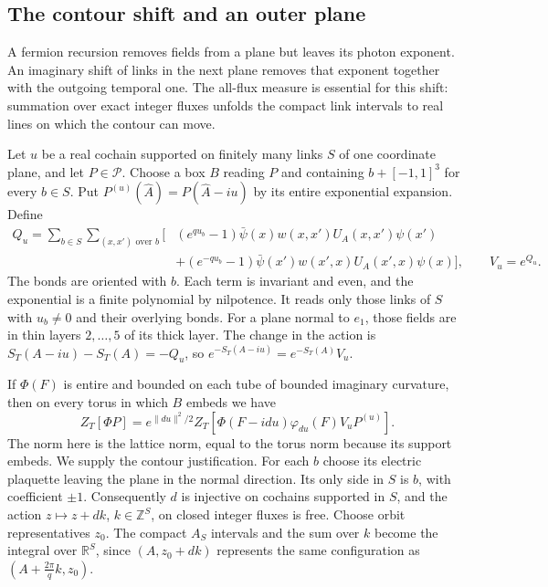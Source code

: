 \documentclass[11pt,letterpaper,reqno]{amsart}
\newcommand{\R}{\mathbb R}
\newcommand{\Z}{\mathbb Z}
\begin{document}
\subsection{The contour shift and an outer plane}\label{subsec:diag-contour}

A fermion recursion removes fields from a plane but leaves its
photon exponent. An imaginary shift of links in the next plane
removes that exponent together with the outgoing temporal one.
The all-flux measure is essential for this shift: summation over
exact integer fluxes unfolds the compact link intervals to
real lines on which the contour can move.

Let $u$ be a real cochain supported on finitely many links $S$
of one coordinate plane, and let $P\in\mathcal P$. Choose a
box $B$ reading $P$ and containing $b+[-1,1]^3$ for every
$b\in S$. Put $P^{(u)}(\widehat A)=P(\widehat A-iu)$ by
its entire exponential expansion. Define
\begin{equation}\label{eq:diag-shift-fermion-polynomial}
 \begin{split}
 Q_u=\sum_{b\in S}\sum_{(x,x')\text{ over }b}\big[&
 (e^{qu_b}-1)\bar\psi(x)w(x,x')U_A(x,x')\psi(x')\\
 &+(e^{-qu_b}-1)\bar\psi(x')w(x',x)U_A(x',x)\psi(x)\big],
 \qquad V_u=e^{Q_u}.
 \end{split}
\end{equation}
The bonds are oriented with $b$. Each term is invariant and
even, and the exponential is a finite polynomial by nilpotence.
It reads only those links of $S$ with $u_b\ne0$ and their
overlying bonds. For a plane normal to $e_1$, those fields
are in thin layers $2,\ldots,5$ of its thick layer. The change
in the action is $S_T(A-iu)-S_T(A)=-Q_u$, so
$e^{-S_T(A-iu)}=e^{-S_T(A)}V_u$.

If $\Phi(F)$ is entire and bounded on each tube of bounded
imaginary curvature, then on every torus in which $B$ embeds
we have
\begin{equation}\label{eq:diag-contour-identity}
 Z_T[\Phi P]=e^{\|du\|^2/2}
       Z_T[\Phi(F-idu)\varphi_{du}(F)V_uP^{(u)}].
\end{equation}
The norm here is the lattice norm, equal to the torus norm
because its support embeds. We supply the contour justification.
For each $b$ choose its electric plaquette leaving the plane
in the normal direction. Its only side in $S$ is $b$, with
coefficient $\pm1$. Consequently $d$ is injective on cochains
supported in $S$, and the action
$z\mapsto z+dk$, $k\in\Z^S$, on closed integer fluxes is free.
Choose orbit representatives $z_0$. The compact $A_S$ intervals
and the sum over $k$ become the integral over $\R^S$, since
$(A,z_0+dk)$ represents the same configuration as
$(A+\frac{2\pi}{q}k,z_0)$.
\end{document}
